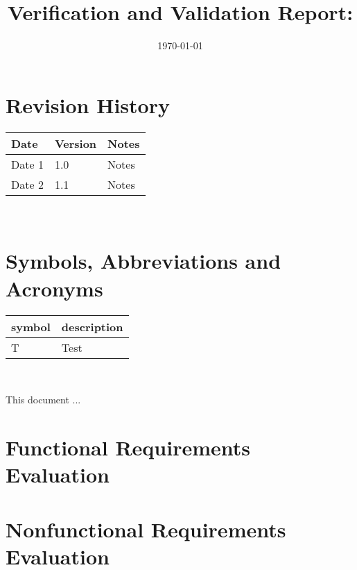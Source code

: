 \documentclass[12pt, titlepage]{article}
\begin{document}
\title{Verification and Validation Report: \progname}
\author{\authname}
\date{\today}

\maketitle


\section{Revision History}

\begin{tabularx}{\textwidth}{p{3cm}p{2cm}X}
  \toprule {\bf Date} & {\bf Version} & {\bf Notes}\\
  \midrule
  Date 1 & 1.0 & Notes\\
  Date 2 & 1.1 & Notes\\
  \bottomrule
\end{tabularx}

~\newpage

\section{Symbols, Abbreviations and Acronyms}

\renewcommand{\arraystretch}{1.2}
\begin{tabular}{l l}
  \toprule
  \textbf{symbol} & \textbf{description}\\
  \midrule
  T & Test\\
  \bottomrule
\end{tabular}\\


\newpage

\tableofcontents

\listoftables %

\listoffigures %

\newpage


This document ...

\section{Functional Requirements Evaluation}

\section{Nonfunctional Requirements Evaluation}
\end{document}
